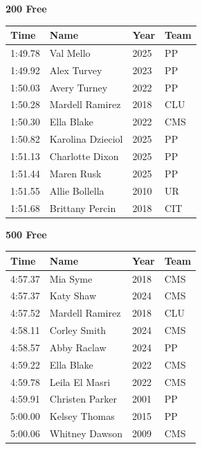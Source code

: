 \vspace{1.2em}
\noindent\begin{minipage}[t]{0.98\textwidth}
\centering
\textbf{\textcolor{teamprimary}{200 Free}}\par
\vspace{0.5em}
\centering
\small
\renewcommand{\arraystretch}{1.0}
\setlength{\tabcolsep}{4pt}
\begin{tabular}{@{}p{2.5cm}p{4.5cm}p{1.5cm}p{2.5cm}@{}}
\toprule
\textbf{Time} & \textbf{Name} & \textbf{Year} & \textbf{Team} \\
\midrule
1:49.78 & Val Mello & 2025 & PP \\
1:49.92 & Alex Turvey & 2023 & PP \\
1:50.03 & Avery Turney & 2022 & PP \\
1:50.28 & Mardell Ramirez & 2018 & CLU \\
1:50.30 & Ella Blake & 2022 & CMS \\
1:50.82 & Karolina Dzieciol & 2025 & PP \\
1:51.13 & Charlotte Dixon & 2025 & PP \\
1:51.44 & Maren Rusk & 2025 & PP \\
1:51.55 & Allie Bollella & 2010 & UR \\
1:51.68 & Brittany Percin & 2018 & CIT \\
\bottomrule
\end{tabular}
\end{minipage}
\vspace{1.2em}
\noindent\begin{minipage}[t]{0.98\textwidth}
\centering
\textbf{\textcolor{teamprimary}{500 Free}}\par
\vspace{0.5em}
\centering
\small
\renewcommand{\arraystretch}{1.0}
\setlength{\tabcolsep}{4pt}
\begin{tabular}{@{}p{2.5cm}p{4.5cm}p{1.5cm}p{2.5cm}@{}}
\toprule
\textbf{Time} & \textbf{Name} & \textbf{Year} & \textbf{Team} \\
\midrule
4:57.37 & Mia Syme & 2018 & CMS \\
4:57.37 & Katy Shaw & 2024 & CMS \\
4:57.52 & Mardell Ramirez & 2018 & CLU \\
4:58.11 & Corley Smith & 2024 & CMS \\
4:58.57 & Abby Raclaw & 2024 & PP \\
4:59.22 & Ella Blake & 2022 & CMS \\
4:59.78 & Leila El Masri & 2022 & CMS \\
4:59.91 & Christen Parker & 2001 & PP \\
5:00.00 & Kelsey Thomas & 2015 & PP \\
5:00.06 & Whitney Dawson & 2009 & CMS \\
\bottomrule
\end{tabular}
\end{minipage}
